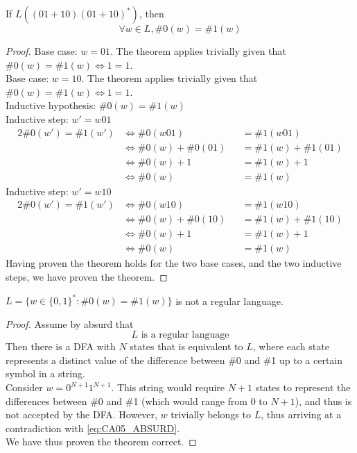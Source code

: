 \documentclass[docid=CA05]{tcom_CA}
\begin{document}
\setcounter{chapter}{4}
{
\renewcommand{\thesubsection}{\thesection\alph{subsection}}
\begin{theorem}
If $L((01+10)(01+10)^*)$, then
\begin{equation*}
	\forall w \in L, \#0(w)=\#1(w)
\end{equation*}
\end{theorem}
\begin{proof}
Base case: $w=01$. The theorem applies trivially given that $\#0(w)=\#1(w) \iff 1=1$.\\
Base case: $w=10$. The theorem applies trivially given that $\#0(w)=\#1(w) \iff 1=1$.\\
Inductive hypothesis: $\#0(w)=\#1(w)$\\
Inductive step: $w'=w01$
\begin{alignat*}{2}
	\#0(w')=\#1(w')
	&\iff \#0(w01)      &&=\#1(w01)\\
	&\iff \#0(w)+\#0(01)&&=\#1(w)+\#1(01)\\
	&\iff \#0(w)+1      &&=\#1(w)+1\\
	&\iff \#0(w)        &&=\#1(w)
\end{alignat*}
Inductive step: $w'=w10$
\begin{alignat*}{2}
	\#0(w')=\#1(w')
	&\iff \#0(w10)      &&=\#1(w10)\\
	&\iff \#0(w)+\#0(10)&&=\#1(w)+\#1(10)\\
	&\iff \#0(w)+1      &&=\#1(w)+1\\
	&\iff \#0(w)        &&=\#1(w)
\end{alignat*}
Having proven the theorem holds for the two base cases, and the two inductive steps, we have proven the theorem.
\end{proof}
\begin{theorem}
	$L=\{w\in \{0,1\}^* \colon \#0(w)=\#1(w)\}$ is not a regular language.
\end{theorem}
\begin{proof}
Assume by absurd that
\begin{equation}\label{eq:CA05_ABSURD}
L \text{ is a regular language}
\end{equation}
Then there is a DFA with $N$ states that is equivalent to $L$, where each state represents a distinct value of the difference between \#0 and \#1 up to a certain symbol in a string.\\
Consider $w=0^{N+1}1^{N+1}$. This string would require $N+1$ states to represent the differences between \#0 and \#1 (which would range from $0$ to $N+1$), and thus is not accepted by the DFA. However, $w$ trivially belongs to $L$, thus arriving at a contradiction with \eqref{eq:CA05_ABSURD}.\\
We have thus proven the theorem correct.
\end{proof}
}
\end{document}

